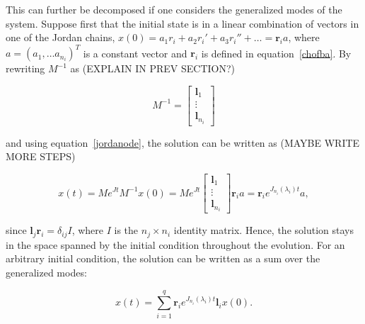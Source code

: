 \documentclass[../main.tex]{subfiles}
\begin{document}
This can further be decomposed if one considers the generalized modes of the system. Suppose first that the initial state is in a linear combination of vectors in one of the Jordan chains, $x(0) = a_1r_i + a_2r_i' + a_3r_i'' + \dots = \boldsymbol{r}_ia$, where $a = (a_1, \dots a_{n_i})^T$ is a constant vector and $\boldsymbol{r}_i$ is defined in equation~\eqref{chofba}. By rewriting $M^{-1}$ as (EXPLAIN IN PREV SECTION?)


\begin{equation}
    M^{-1} = \begin{bmatrix} \boldsymbol{l}_1 \\ \vdots \\ \boldsymbol{l}_{n_i} \end{bmatrix}
\end{equation}

and using equation~\eqref{jordanode}, the solution can be written as (MAYBE WRITE MORE STEPS)

\begin{equation}\label{genmode}
    x(t) = Me^{Jt}M^{-1}x(0) = Me^{Jt} \begin{bmatrix} \boldsymbol{l}_1 \\ \vdots \\ \boldsymbol{l}_{n_i} \end{bmatrix} \boldsymbol{r}_ia = \boldsymbol{r}_i e^{J_{n_i}(\lambda_i)t} a,
\end{equation}

since $\boldsymbol{l}_j\boldsymbol{r}_i = \delta_{ij}I$, where $I$ is the $n_j\times n_i$ identity matrix. Hence, the solution stays in the space spanned by the initial condition throughout the evolution. For an arbitrary initial condition, the solution can be written as a sum over the generalized modes: 

\begin{equation}
    x(t) = \sum_{i=1}^q \boldsymbol{r}_i e^{J_{n_i}(\lambda_i)t} \boldsymbol{l}_i x(0).
\end{equation}
\end{document}
